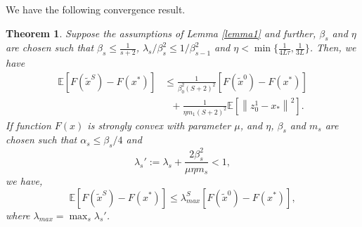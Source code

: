 \documentclass{article}
\newcommand*{\E}{\mathbb{E}}
\newcommand{\norm}[1]{\left\lVert#1\right\rVert}
\newtheorem{theorem}{Theorem}[section]
\theoremstyle{definition}
\theoremstyle{remark}
\begin{document}
We have the following convergence result.
\begin{theorem}\label{conve-theorem}
Suppose the assumptions of Lemma \ref{lemma1} and further, $\beta_s$ and $\eta$ are chosen such that $\beta_s\leq \frac{1}{s+2}$,  $\lambda_s/\beta_s^2 \leq 1/\beta_{s-1}^2$ and $\eta < \min\{\frac{1}{4L
\tau}, \frac{1}{3L}\}$. 
Then, we have
\begin{equation}
\begin{split}
{\E[F(\widetilde{x}^S)-F(x^*)]}&\leq \frac{1}{\beta_{0}^2(S+2)^2}[F(\widetilde{x}^{0})-F(x^*)] \\ 
&~~~ + {\frac{1}{\eta m_{1}(S+2)^2}}\E[\norm{z_{0}^1-x_*}^2].
\end{split}
\end{equation}
If function $F(x)$ is strongly convex with parameter $\mu$, and $\eta$, $\beta_s$ and $m_s$ are chosen such that $\alpha_s\leq \beta_s/4$ and
\[
\lambda_s' := \lambda_s+{\frac{2 \beta_s^2}{\mu\eta m_s}} < 1,
\]
we have, 
\begin{equation}
\E\left[F(\widetilde{x}^S)-F(x^*)\right]\leq \lambda_{max}^S\left[F(\widetilde{x}^0)-F(x^*)\right],
\end{equation}
where $\lambda_{max} = \max_{s}{\lambda_s'}$.
\end{theorem}
\end{document}
